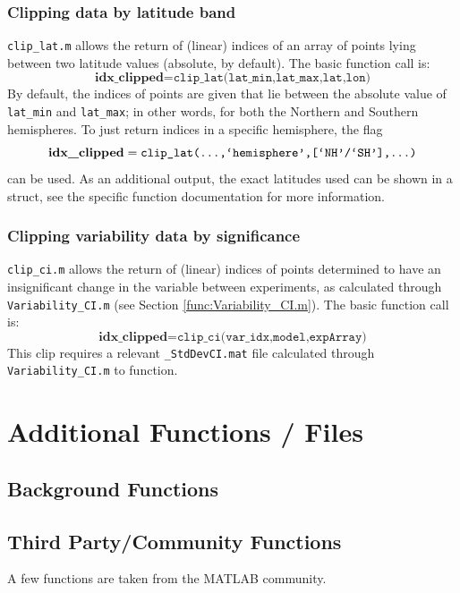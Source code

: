 \documentclass{article}
\begin{document}
\subsubsection{Clipping data by latitude band}
\texttt{clip\_lat.m} allows the return of (linear) indices of an array of points lying between two latitude values (absolute, by default). The basic function call is:
\begin{equation}
\textbf{idx\_clipped} = \texttt{clip\_lat(lat\_min,lat\_max,lat,lon)}
\end{equation}
By default, the indices of points are given that lie between the absolute value of \texttt{lat\_min} and \texttt{lat\_max}; in other words, for both the Northern and Southern hemispheres. To just return indices in a specific hemisphere, the flag 
\begin{equation}
\textbf{idx\_clipped} = \texttt{clip\_lat(\dots,`hemisphere',[`NH'/`SH'],\dots)}
\end{equation}
can be used. As an additional output, the exact latitudes used can be shown in a struct, see the specific function documentation for more information. 

\subsubsection{Clipping variability data by significance}
\texttt{clip\_ci.m} allows the return of (linear) indices of points determined to have an insignificant change in the variable between experiments, as calculated through \texttt{Variability\_CI.m} (see Section \ref{func:Variability_CI.m}). The basic function call is: 
\begin{equation}
\textbf{idx\_clipped} = \texttt{clip\_ci(var\_idx,model,expArray)}
\end{equation}
This clip requires a relevant \texttt{\_StdDevCI.mat} file calculated through \texttt{Variability\_CI.m} to function.  


\section{Additional Functions / Files} %
\subsection{Background Functions}

\subsection{Third Party/Community Functions}
A few functions are taken from the MATLAB community. 
\end{document}
